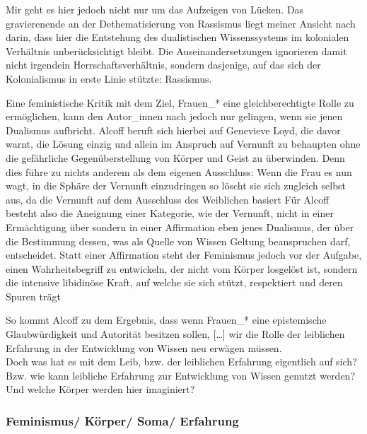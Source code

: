 Mir geht es hier jedoch nicht nur um das Aufzeigen von Lücken. Das gravierenende an
der Dethematisierung von Rassismus liegt meiner Ansicht nach darin, dass hier
die Entstehung des dualistischen Wissenssystems im kolonialen Verhältnis
unberücksichtigt bleibt. Die Auseinandersetzungen ignorieren damit nicht
irgendein Herrschaftsverhältnis, sondern dasjenige, auf das sich der
Kolonialismus in erste Linie stützte: Rassismus.

Eine feministische Kritik mit
dem Ziel, Frauen\_* eine gleichberechtigte Rolle zu ermöglichen, kann den
Autor\_innen nach jedoch nur gelingen, wenn sie jenen Dualismus aufbricht.
Alcoff beruft sich hierbei auf Genevieve Loyd, die davor warnt, die Lösung
einzig und allein im Anspruch auf Vernunft zu behaupten ohne die gefährliche
Gegenüberstellung von Körper und Geist zu überwinden. Denn dies führe zu nichts
anderem als dem eigenen Ausschluss: \glqq Wenn die Frau es nun wagt, in die Sphäre
der Vernunft einzudringen so löscht sie sich zugleich selbst aus, da die
Vernunft auf dem Ausschluss des Weiblichen basiert \grqq \footnotemark
{} Für Alcoff besteht also
die Aneignung einer Kategorie, wie der Vernunft, nicht in einer Ermächtigung
über sondern in einer Affirmation eben jenes Dualismus, der über die Bestimmung
dessen, was als Quelle von Wissen Geltung beanspruchen darf, entscheidet. Statt
einer Affirmation steht der Feminismus jedoch vor der Aufgabe, einen
Wahrheitsbegriff zu entwickeln, der nicht vom Körper losgelöst ist, sondern
\glqq
die intensive libidinöse Kraft, auf welche sie sich stützt, respektiert und
deren Spuren trägt \grqq \footnotemark {}

So kommt Alcoff zu dem Ergebnis, dass \glqq wenn Frauen\_* eine
epistemische Glaubwürdigkeit und Autorität besitzen sollen, […] wir die Rolle
der leiblichen Erfahrung in der Entwicklung von Wissen neu erwägen \grqq
\footnotemark {} müssen.
\\

Doch was hat es mit dem Leib, bzw. der leiblichen Erfahrung eigentlich auf
sich? Bzw. wie kann leibliche Erfahrung zur Entwicklung von Wissen genutzt
werden? Und welche Körper werden hier imaginiert?

\subsubsection{Feminismus/ Körper/ Soma/ Erfahrung}

